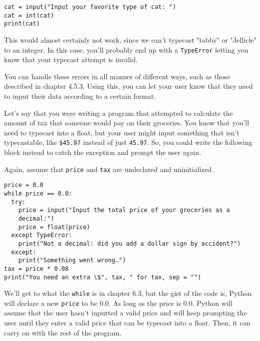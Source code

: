 \begin{lstlisting}[style=pippython]
cat = input("Input your favorite type of cat: ")
cat = int(cat)
print(cat)
\end{lstlisting}
This would almost certainly not work, since we can't typecast "tabby" or "Jellicle" to an integer. In this case, you'll probably end up with a \verb|TypeError| letting you know that your typecast attempt is invalid.\par
You can handle these errors in all manner of different ways, such as those described in chapter 4.5.3. Using this, you can let your user know that they need to input their data according to a certain format.\par
Let's say that you were writing a program that attempted to calculate the amount of tax that someone would pay on their groceries. You know that you'll need to typecast into a float, but your user might input something that isn't typecastable, like \verb|$45.97| instead of just \verb|45.97|. So, you could write the following block instead to catch the exception and prompt the user again.\par
Again, assume that \verb|price| and \verb|tax| are undeclared and uninitialized.\par
\begin{lstlisting}[style=pippython]
price = 0.0
while price == 0.0:
  try:
    price = input("Input the total price of your groceries as a 
    decimal:")
    price = float(price)
  except TypeError:
    print("Not a decimal: did you add a dollar sign by accident?")
  except:
    print("Something went wrong.")
tax = price * 0.08
print("You need an extra \$", tax, " for tax, sep = "")
\end{lstlisting}
We'll get to what the \verb|while| is in chapter 6.3, but the gist of the code is, Python will declare a new  \verb|price| to be 0.0. As long as the price is 0.0, Python will assume that the user hasn't inputted a valid price and will keep prompting the user until they enter a valid price that can be typecast into a float. Then, it can carry on with the rest of the program.\par
